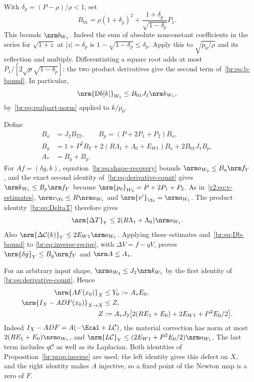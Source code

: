With $\delta_p=(P-\rho)/\rho<1$, set
\begin{equation}\label{br:eq:b-bound}
 B_{01}=\rho(1+\delta_p)^2+
                 \frac{1+\delta_p}{\sqrt{1-\delta_p}}P_1.
\end{equation}
This bounds $\nrm b_{W_1}$. Indeed the sum of absolute nonconstant
coefficients in the series for $\sqrt{1+z}$ at $|z|=\delta_p$ is
$1-\sqrt{1-\delta_p}\le\delta_p$. Apply this to $\sqrt{p_0/\rho}$ and
its reflection and multiply. Differentiating a square root adds at
most $P_1/[2\sqrt\rho\sqrt{1-\delta_p}]$; the two product derivatives
give the second term of~\eqref{br:eq:b-bound}. In particular,
\begin{equation}\label{br:eq:Db-bound}
 \nrm{\mathrm Db[k]}_{W_1}\le B_{01}J_1\nrm k_{W_1},
\end{equation}
by~\eqref{br:eq:realpart-norm} applied to $k/p_0$.

Define
\begin{equation}\label{br:eq:inverse-norm-data}
 \begin{split}
 B_a&=J_2B_{T2},\qquad B_p=(P+2P_1+P_2)B_a,\\
 B_g&=1+P^2B_Y+2(R\Lambda_1+\Lambda_0+E_{W1})B_a
                         +2B_{01}J_1B_p,\\
 A_*&=B_g+B_p.
 \end{split}
\end{equation}
For $Af=(\delta g,k)$, equation~\eqref{br:eq:shape-recovery} bounds
$\nrm a_{W_2}\le B_a\nrm f_Y$, and the exact second identity
of~\eqref{br:eq:derivative-count} gives
$\nrm k_{W_1}\le B_p\nrm f_Y$ because
$\nrm{p_0}_{W_2}=P+2P_1+P_2$.
As in~\eqref{r2:eq:v-estimates}, $\nrm v_{\Yc}\le R\nrm a_{W_1}$
and $\nrm{v'}_{\Yc}=\nrm a_{W_1}$.
The product identity~\eqref{br:eq:DeltaT} therefore gives
\[
 \nrm{\Delta T}_Y\le2(R\Lambda_1+\Lambda_0)\nrm a_{W_1}.
\]
Also $\nrm{\Delta\mathcal C(k)}_Y\le2E_{W1}\nrm a_{W_1}$.
Applying these estimates and~\eqref{br:eq:Db-bound} to
\eqref{br:eq:inverse-recipe}, with $\Delta V=f-qV$, proves
$\nrm{\delta g}_Y\le B_g\nrm f_Y$ and $\nrm A\le A_*$.

For an arbitrary input shape,
$\nrm a_{W_2}\le J_2\nrm k_{W_1}$ by the first identity of
\eqref{br:eq:derivative-count}. Hence
\begin{equation}\label{br:eq:Newton-data}
 \begin{split}
 \nrm{AF(x_0)}_X&\le Y_0:=A_*E_0,\\
 \nrm{I_X-A DF(x_0)}_{X\to X}&\le Z,\\
 Z&:=A_*J_2\bigl[2(RE_1+E_0)+2E_{W1}+P^2E_0/2\bigr].
 \end{split}
\end{equation}
Indeed $I_X-A DF=A(-\Ecal+L\mathcal C)$, the material correction has
norm at most $2(RE_1+E_0)\nrm a_{W_1}$, and
$\nrm{L\mathcal C}_Y\le(2E_{W1}+P^2E_0/2)\nrm a_{W_1}$.
The last term includes $q\mathcal C$ as well as its Laplacian.
Both identities of Proposition~\ref{br:prop:inverse} are used: the left
identity gives this defect on $X$, and the right identity makes $A$
injective, so a fixed point of the Newton map is a zero of $F$.

